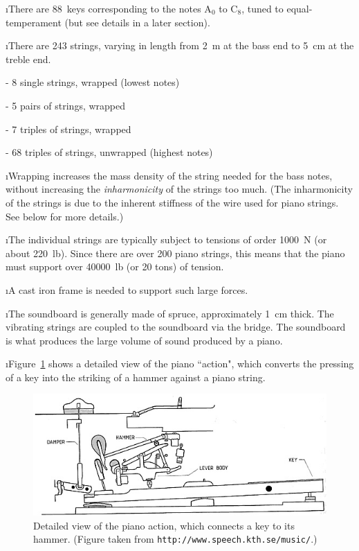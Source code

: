 \i There are 88~keys corresponding to the notes
A${}_0$ to C${}_8$, tuned to equal-temperament
(but see details in a later section).

\i There are 243 strings, varying in length 
from 2~m at the bass end to 5~cm at the treble end.

- 8 single strings, wrapped (lowest notes)

- 5 pairs of strings, wrapped

- 7 triples of strings, wrapped

- 68 triples of strings, unwrapped (highest notes)

\i Wrapping increases the mass density of the string
needed for the bass notes, without increasing
the {\em inharmonicity} of the strings too much.
(The inharmonicity of the strings is due to the 
inherent stiffness of the wire used for piano strings.  
See below for more details.)

\i The individual strings are typically subject to
tensions of order 1000~N (or about 220~lb).
Since there are over 200 piano strings, this means
that the piano must support over 40000~lb (or 20 tons)
of tension.

\i A cast iron frame is needed to support such large
forces.

\i The soundboard is generally made of spruce, 
approximately 1~cm thick.
The vibrating strings are coupled to the soundboard
via the bridge.
The soundboard is what produces the large volume of
sound produced by a piano.

\i Figure~\ref{f:piano-action2} shows a detailed view of
the piano ``action", which converts the pressing of a key
into the striking of a hammer against a piano string.
%
\begin{figure}[htbp]
\begin{center}
\includegraphics[width=.9\textwidth]{piano-action2.jpg}
\caption{
Detailed view of the piano action, which connects a key 
to its hammer.
(Figure taken from 
{\tt http://www.speech.kth.se/music/}.)}
\label{f:piano-action2}
\end{center}
\end{figure}


